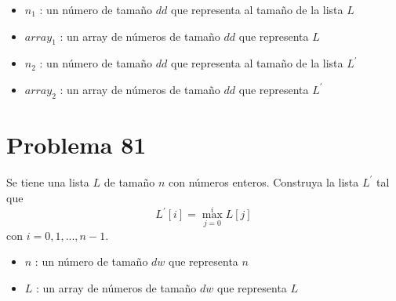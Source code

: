 \documentclass{report}
\begin{document}
\begin{itemize}
    \item $n_1$ : un número de tamaño $dd$ que representa al tamaño de la lista $L$
    \item $array_1$ : un array de números de tamaño $dd$ que representa $L$
    \item $n_2$ : un número de tamaño $dd$ que representa al tamaño de la lista $L^{'}$
    \item $array_2$ : un array de números de tamaño $dd$ que representa $L^{'}$
\end{itemize}

\begin{tcolorbox}
    
\end{tcolorbox}

\newpage

\section*{Problema 81}

Se tiene una lista $L$ de tamaño $n$ con números enteros. Construya la lista $L^\prime$ tal que
$$L^\prime[i]= \max_{j=0}^i L[j]$$
con $i=0,1,...,n-1$.

\begin{itemize}
    \item $n$ : un número de tamaño $dw$ que representa $n$
    \item $L$ : un array de números de tamaño $dw$ que representa $L$
\end{itemize}

\begin{tcolorbox}
    
\end{tcolorbox}
\end{document}
